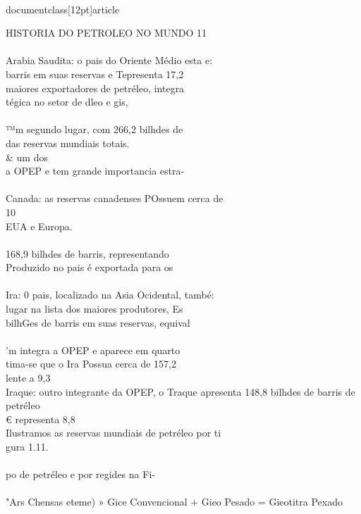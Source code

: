 \\documentclass[12pt]{article}
\begin{document}
{HISTORIA DO PETROLEO NO MUNDO 11\\
\\
Arabia Saudita: o pais do Oriente Médio esta e:\\
barris em suas reservas e Tepresenta 17,2\\%
maiores exportadores de petréleo, integra\\
tégica no setor de dleo e gis,\\
\\
™m segundo lugar, com 266,2 bilhdes de\\
das reservas mundiais totais. \\& um dos\\
a OPEP e tem grande importancia estra-\\
\\
Canada: as reservas canadenses POssuem cerca de\\
10\\%
EUA e Europa.\\
\\
168,9 bilhdes de barris, representando\\
Produzido no pais é exportada para os\\
\\
Ira: 0 pais, localizado na Asia Ocidental, també:\\
lugar na lista dos maiores produtores, Es\\
bilhGes de barris em suas reservas, equival\\
\\
'm integra a OPEP e aparece em quarto\\
tima-se que o Ira Possua cerca de 157,2\\
lente a 9,3\\%
Iraque: outro integrante da OPEP, o Traque apresenta 148,8 bilhdes de barris de petréleo\\
€ representa 8,8\\%
Ilustramos as reservas mundiais de petréleo por ti\\
gura 1.11.\\
\\
po de petréleo e por regides na Fi-\\
\\
"Ars Chensas eteme) » Gice Convencional + Gieo Pesado = Gieotitra Pexado\\
}
\end{document}
